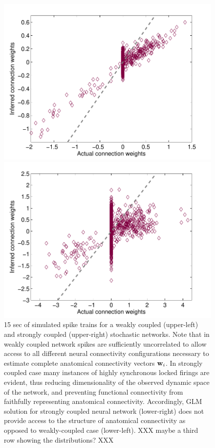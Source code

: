 \begin{figure}[h]
\begin{minipage}[c]{0.45\hsize}
\includegraphics[width=\hsize]{../figs/Figure8b_fluor_weak_glm}
\end{minipage}
\begin{minipage}[c]{0.45\hsize}
\includegraphics[width=\hsize]{../figs/Figure8a_fluor_strong_glm}
\end{minipage}
\caption{15 sec of simulated spike trains for a weakly coupled (upper-left)
and strongly coupled (upper-right) stochastic networks. Note that in weakly coupled network spikes are sufficiently uncorrelated to allow access to all different neural connectivity configurations necessary to estimate complete anatomical connectivity vectors ${\bf w}_i$. In strongly coupled case many instances of highly synchronous locked firings are evident, thus reducing dimensionality of the observed dynamic space of the network, and preventing functional connectivity from faithfully representing anatomical connectivity.
Accordingly, GLM solution for strongly coupled neural network (lower-right) does not provide access to the structure of anatomical connectivity as opposed to weakly-coupled case (lower-left).  XXX maybe a third row showing the distributions? XXX}
\label{fig:rasters}
\end{figure}

